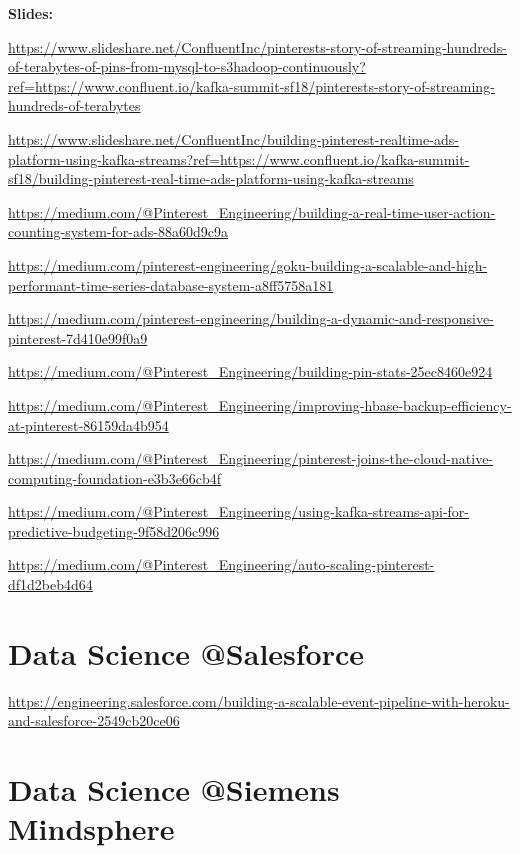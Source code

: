 \documentclass[12pt, numbers=noenddot]{scrreprt} %
\begin{document}
\textbf{Slides:}

\url{https://www.slideshare.net/ConfluentInc/pinterests-story-of-streaming-hundreds-of-terabytes-of-pins-from-mysql-to-s3hadoop-continuously?ref=https://www.confluent.io/kafka-summit-sf18/pinterests-story-of-streaming-hundreds-of-terabytes}

\url{https://www.slideshare.net/ConfluentInc/building-pinterest-realtime-ads-platform-using-kafka-streams?ref=https://www.confluent.io/kafka-summit-sf18/building-pinterest-real-time-ads-platform-using-kafka-streams}

\url{https://medium.com/@Pinterest_Engineering/building-a-real-time-user-action-counting-system-for-ads-88a60d9c9a}

\url{https://medium.com/pinterest-engineering/goku-building-a-scalable-and-high-performant-time-series-database-system-a8ff5758a181}

\url{https://medium.com/pinterest-engineering/building-a-dynamic-and-responsive-pinterest-7d410e99f0a9}

\url{https://medium.com/@Pinterest_Engineering/building-pin-stats-25ec8460e924}

\url{https://medium.com/@Pinterest_Engineering/improving-hbase-backup-efficiency-at-pinterest-86159da4b954}

\url{https://medium.com/@Pinterest_Engineering/pinterest-joins-the-cloud-native-computing-foundation-e3b3e66cb4f}

\url{https://medium.com/@Pinterest_Engineering/using-kafka-streams-api-for-predictive-budgeting-9f58d206c996}

\url{https://medium.com/@Pinterest_Engineering/auto-scaling-pinterest-df1d2beb4d64}

\section{Data Science @Salesforce}
\url{https://engineering.salesforce.com/building-a-scalable-event-pipeline-with-heroku-and-salesforce-2549cb20ce06}

\section{Data Science @Siemens Mindsphere}
\end{document}
